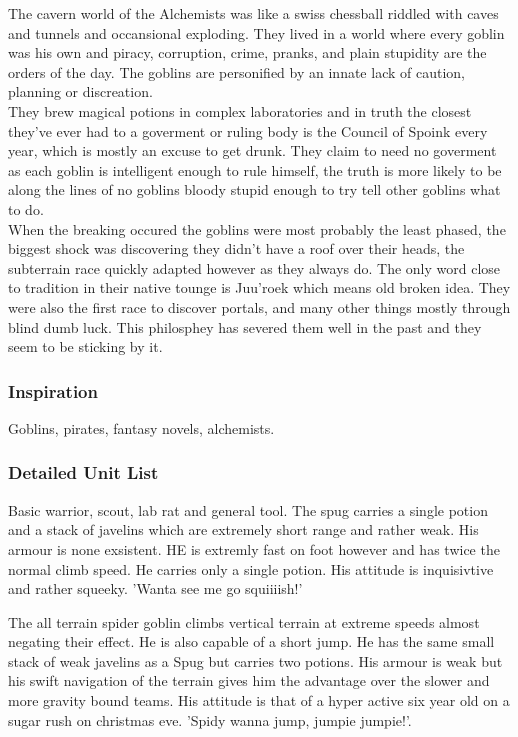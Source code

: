 \documentclass[a4paper]{article}
\begin{document}
The cavern world of the Alchemists was like a swiss chessball riddled with caves and tunnels and occansional exploding. They lived in a world where every goblin was his own and piracy, corruption, crime, pranks, and plain stupidity are the orders of the day. The goblins are personified by an innate lack of caution, planning or discreation.\\
They brew magical potions in complex laboratories and in truth the closest they've ever had to a goverment or ruling body is the Council of Spoink every year, which is mostly an excuse to get drunk. They claim to need no goverment as each goblin is intelligent enough to rule himself, the truth is more likely to be along the lines of no goblins bloody stupid enough to try tell other goblins what to do.\\
When the breaking occured the goblins were most probably the least phased, the biggest shock was discovering they didn't have a roof over their heads, the subterrain race quickly adapted however as they always do. The only word close to tradition in their native tounge is Juu'roek which means old broken idea. They were also the first race to discover portals, and many other things mostly through blind dumb luck. This philosphey has severed them well in the past and they seem to be sticking by it.

\subsubsection{Inspiration}

Goblins, pirates, fantasy novels, alchemists.

\subsubsection{Detailed Unit List}

Basic warrior, scout, lab rat and general tool. The spug carries a single potion and a stack of javelins which are extremely short range and rather weak. His armour is none exsistent. HE is extremly fast on foot however and has twice the normal climb speed. He carries only a single potion. His attitude is inquisivtive and rather squeeky. 'Wanta see me go squiiiish!'

The all terrain spider goblin climbs vertical terrain at extreme speeds almost negating their effect. He is also capable of a short jump. He has the same small stack of weak javelins as a Spug but carries two potions. His armour is weak but his swift navigation of the terrain gives him the advantage over the slower and more gravity bound teams. His attitude is that of a hyper active six year old on a sugar rush on christmas eve. 'Spidy wanna jump, jumpie jumpie!'.
\end{document}
